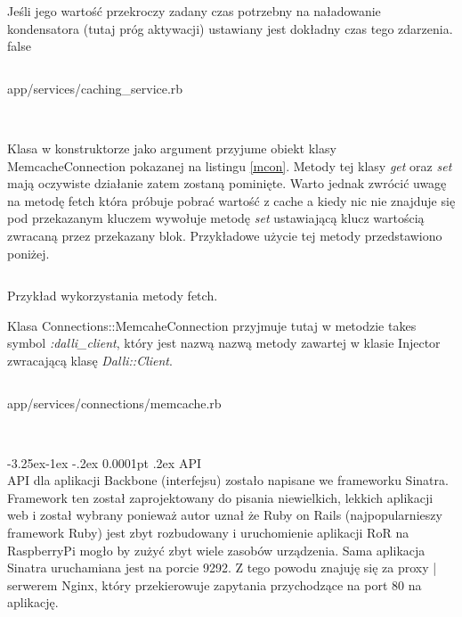 \documentclass[11pt,a4paper, twoside]{article}
\makeatletter
\renewcommand\paragraph{\@startsection{paragraph}{4}{\z@}%
                                     {-3.25ex\@plus -1ex \@minus -.2ex}%
                                     {0.0001pt \@plus .2ex}%
                                     {\normalfont\normalsize\bfseries}}
\makeatother
\begin{document}
Jeśli jego wartość przekroczy zadany czas potrzebny na naładowanie kondensatora (tutaj próg aktywacji) ustawiany jest dokładny czas tego zdarzenia. %
\if false
\newpage
\begin{listing}[H]
\inputminted[linenos=true]{ruby}{./src/cachingservice.rb}
\caption{app/services/caching\_service.rb}
$\label{caching}$
\end{listing}
\noindent
Klasa w konstruktorze jako argument przyjume obiekt klasy \mbox{MemcacheConnection} pokazanej na listingu \ref{mcon}. Metody tej klasy \emph{get} oraz \emph{set} mają oczywiste działanie zatem zostaną pominięte. Warto jednak zwrócić uwagę na metodę fetch która próbuje pobrać wartość z cache a kiedy nic nie znajduje się pod przekazanym kluczem wywołuje metodę \emph{set} ustawiającą klucz wartością zwracaną przez przekazany blok. Przykładowe użycie tej metody przedstawiono poniżej.
\begin{listing}
\inputminted[linenos=true]{ruby}{./src/fetch.rb}
\caption{Przykład wykorzystania metody fetch.}
\end{listing}
\newpage
\noindent
Klasa Connections::MemcaheConnection przyjmuje tutaj w metodzie takes symbol \emph{:dalli\_client}, który jest nazwą nazwą metody zawartej w klasie Injector zwracającą klasę \emph{Dalli::Client}.
\begin{listing}
\inputminted[linenos=true]{ruby}{./src/memcache.rb}
\caption{app/services/connections/memcache.rb}
$\label{mcon}$
\end{listing}
\fi
\newpage
\paragraph{API} ~\\
API dla aplikacji Backbone (interfejsu) zostało napisane we frameworku Sinatra. Framework ten został  zaprojektowany do pisania niewielkich, lekkich aplikacji web i został wybrany ponieważ autor uznał że Ruby on Rails (najpopularnieszy framework Ruby) jest zbyt rozbudowany i uruchomienie aplikacji RoR na RaspberryPi mogło by zużyć zbyt wiele zasobów urządzenia. Sama aplikacja Sinatra uruchamiana jest na porcie 9292. Z tego powodu znajuję się za proxy | serwerem Nginx, który przekierowuje zapytania przychodzące na port 80 na aplikację.
\end{document}
